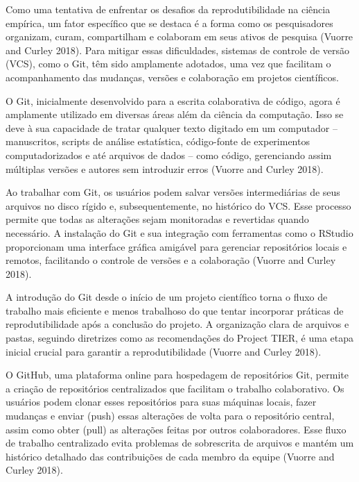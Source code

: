 \documentclass[
  a4paper,
]{article}
\begin{document}
\begin{tcolorbox}[enhanced jigsaw, toptitle=1mm, opacitybacktitle=0.6, colframe=quarto-callout-note-color-frame, rightrule=.15mm, coltitle=black, breakable, titlerule=0mm, colbacktitle=quarto-callout-note-color!10!white, colback=white, title=\textcolor{quarto-callout-note-color}{\faInfo}\hspace{0.5em}{@vuorre2018 \emph{Reading Note} (Tip~\ref{tip-prompt})}, left=2mm, leftrule=.75mm, opacityback=0, toprule=.15mm, bottomrule=.15mm, bottomtitle=1mm, arc=.35mm]

Como uma tentativa de enfrentar os desafios da reprodutibilidade na
ciência empírica, um fator específico que se destaca é a forma como os
pesquisadores organizam, curam, compartilham e colaboram em seus ativos
de pesquisa (Vuorre and Curley 2018). Para mitigar essas dificuldades,
sistemas de controle de versão (VCS), como o Git, têm sido amplamente
adotados, uma vez que facilitam o acompanhamento das mudanças, versões e
colaboração em projetos científicos.

O Git, inicialmente desenvolvido para a escrita colaborativa de código,
agora é amplamente utilizado em diversas áreas além da ciência da
computação. Isso se deve à sua capacidade de tratar qualquer texto
digitado em um computador -- manuscritos, scripts de análise
estatística, código-fonte de experimentos computadorizados e até
arquivos de dados -- como código, gerenciando assim múltiplas versões e
autores sem introduzir erros (Vuorre and Curley 2018).

Ao trabalhar com Git, os usuários podem salvar versões intermediárias de
seus arquivos no disco rígido e, subsequentemente, no histórico do VCS.
Esse processo permite que todas as alterações sejam monitoradas e
revertidas quando necessário. A instalação do Git e sua integração com
ferramentas como o RStudio proporcionam uma interface gráfica amigável
para gerenciar repositórios locais e remotos, facilitando o controle de
versões e a colaboração (Vuorre and Curley 2018).

A introdução do Git desde o início de um projeto científico torna o
fluxo de trabalho mais eficiente e menos trabalhoso do que tentar
incorporar práticas de reprodutibilidade após a conclusão do projeto. A
organização clara de arquivos e pastas, seguindo diretrizes como as
recomendações do Project TIER, é uma etapa inicial crucial para garantir
a reprodutibilidade (Vuorre and Curley 2018).

O GitHub, uma plataforma online para hospedagem de repositórios Git,
permite a criação de repositórios centralizados que facilitam o trabalho
colaborativo. Os usuários podem clonar esses repositórios para suas
máquinas locais, fazer mudanças e enviar (push) essas alterações de
volta para o repositório central, assim como obter (pull) as alterações
feitas por outros colaboradores. Esse fluxo de trabalho centralizado
evita problemas de sobrescrita de arquivos e mantém um histórico
detalhado das contribuições de cada membro da equipe (Vuorre and Curley
2018).


\end{tcolorbox}
\end{document}
